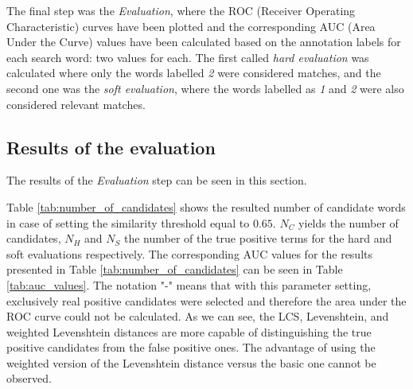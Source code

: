 The final step was the \textit{Evaluation}, where the ROC (Receiver Operating Characteristic) curves have been plotted and the corresponding AUC (Area Under the Curve) values have been calculated based on the annotation labels for each search word: two values for each. The first called \textit{hard evaluation} was calculated where only the words labelled \textit{2} were considered matches, and the second one was the \textit{soft evaluation}, where the words labelled as \textit{1} and \textit{2} were also considered relevant matches.

\subsection{Results of the evaluation}

The results of the \textit{Evaluation} step can be seen in this section.

Table \ref{tab:number_of_candidates} shows the resulted number of candidate words in case of setting the similarity threshold equal to $0.65$. $N_C$ yields the number of candidates, $N_H$ and $N_S$ the number of the true positive terms for the hard and soft evaluations respectively. The corresponding AUC values for the results presented in Table \ref{tab:number_of_candidates} can be seen in Table \ref{tab:auc_values}. The notation "-" means that with this parameter setting, exclusively real positive candidates were selected and therefore the area under the ROC curve could not be calculated. As we can see, the LCS, Levenshtein, and weighted Levenshtein distances are more capable of distinguishing the true positive candidates from the false positive ones. The advantage of using the weighted version of the Levenshtein distance versus the basic one cannot be observed.


